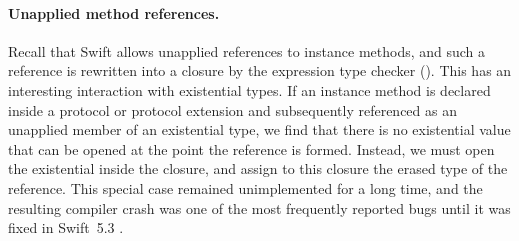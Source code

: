 \documentclass[../generics]{subfiles}
\begin{document}
\paragraph{Unapplied method references.}
Recall that Swift allows unapplied references to instance methods, and such a reference is rewritten into a closure by the expression type checker (). This has an interesting interaction with existential types. If an instance method is declared inside a protocol or protocol extension and subsequently referenced as an unapplied member of an existential type, we find that there is no existential value that can be opened at the point the reference is formed. Instead, we must open the existential inside the closure, and assign to this closure the erased type of the reference. This special case remained unimplemented for a long time, and the resulting compiler crash was one of the most frequently reported bugs until it was fixed in Swift~5.3 \cite{sr75}.
\end{document}
